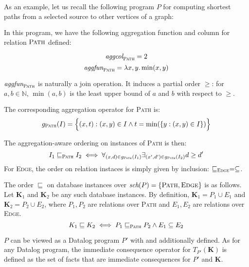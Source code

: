 \begin{exmp}
As an example, let us recall the following program $P$ for computing shortest paths from a selected source to other vertices of a graph:



In this program, we have the following aggregation function and column for relation $\textsc{Path}$ defined:

$$ \textit{aggcol}_\textsc{Path} = 2 $$
$$ \textit{aggfun}_\textsc{Path} = \lambda x, y. \min(x, y) $$

$\textit{aggfun}_\textsc{Path}$ is naturally a join operation. It induces a partial order $\ge$: for $a, b \in \mathbb{N}$, $\min(a, b)$ is the least upper bound of $a$ and $b$ with respect to $\ge$.

The corresponding aggregation operator for \textsc{Path} is:
$$g_\textsc{Path}(I) = \Big\{(x, t): (x, y) \in I \wedge t = \min(\{y: (x, y) \in I\})\Big\} $$

The aggregation-aware ordering on instances of \textsc{Path} is then:
$$ I_1 \sqsubseteq_\textsc{Path} I_2 \iff \forall_{(x, d) \in g_\textsc{Path}(I_1)} \exists_{(x', d') \in g_\textsc{Path}(I_2)} d \ge d' $$
For \textsc{Edge}, the order on relation instaces is simply given by inclusion: $\sqsubseteq_\textsc{Edge} = \subseteq$.

The order $\sqsubseteq$ on database instances over $\textit{sch}(P) = \{\textsc{Path}, \textsc{Edge}\}$ is as follows. Let \textbf{K}$_1$ and \textbf{K}$_2$ be any such database instances. By definition, $\textbf{K}_1 = P_1 \cup E_1$ and $\textbf{K}_2 = P_2 \cup E_2$, where $P_1, P_2$ are relations over \textsc{Path} and $E_1, E_2$ are relations over \textsc{Edge}.
$$ K_1 \sqsubseteq K_2 \iff P_1 \sqsubseteq_\textsc{Path} P_2 \wedge E_1 \subseteq E_2 $$

$P$ can be viewed as a Datalog program $P'$ with \aggcol and \aggfun additionally defined. As for any Datalog program, the immediate consequence operator for $T_{P'}(\textbf{K})$ is defined as the set of facts that are immediate consequences for $P'$ and \textbf{K}.


\end{exmp}
